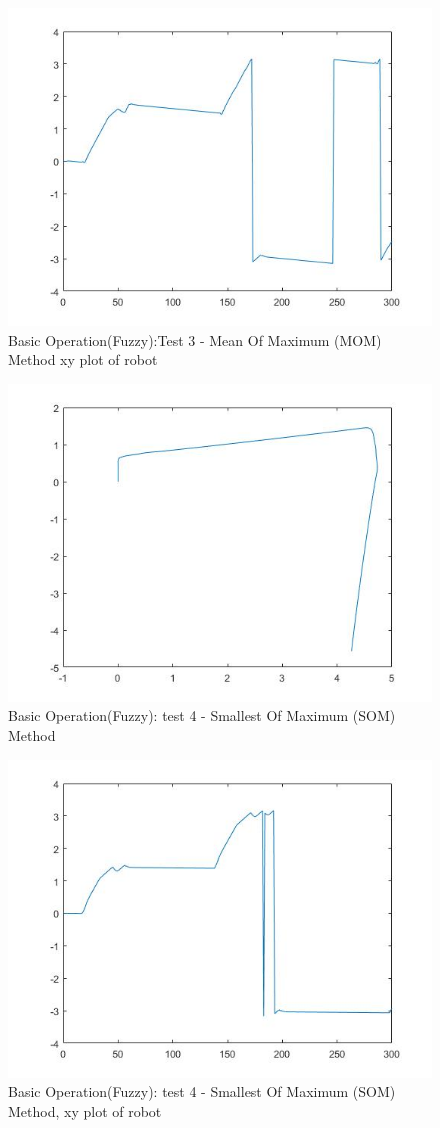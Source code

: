 \documentclass{l4proj}
\begin{document}
\begin{figure}[htb]
    \centering
    \includegraphics[width=0.5\linewidth]{images/Mofig4.jpg}

    \caption{Basic Operation(Fuzzy):Test 3 - Mean Of Maximum (MOM) Method xy plot of robot }
    \label{fig:Model1sim4} 
\end{figure}
\begin{figure}[htb]
    \centering
    \includegraphics[width=0.5\linewidth]{images/sofig2.jpg}

    \caption{Basic Operation(Fuzzy): test 4 - Smallest Of Maximum (SOM) Method}
    \label{fig:Model1sim4} 
\end{figure}
\begin{figure}[htb]
    \centering
    \includegraphics[width=0.5\linewidth]{images/sofig4.jpg}

    \caption{Basic Operation(Fuzzy): test 4 - Smallest Of Maximum (SOM) Method, xy plot of robot}
    \label{fig:Model1sim4} 
\end{figure}
\end{document}
